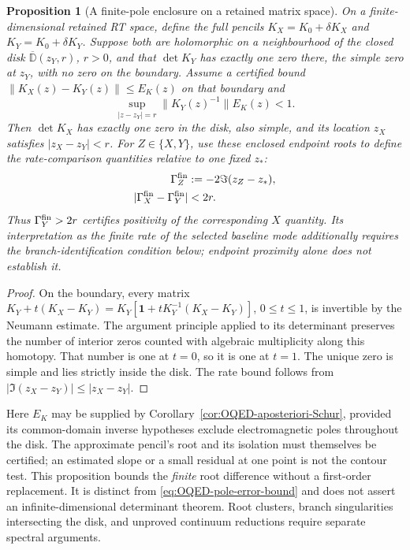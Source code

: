 \documentclass[final,5p,times,twocolumn,numbers,nopreprintline]{elsarticle}
\numberwithin{equation}{section}
\newtheorem{proposition}[theorem]{Proposition}
\theoremstyle{definition}
\theoremstyle{remark}
\newcommand{\one}{\mathbf 1}
\begin{document}
\begin{proposition}[A finite-pole enclosure on a retained matrix space]
\label{prop:OQED-finite-pole-enclosure}
On a finite-dimensional retained RT space, define the full pencils
\(K_X=K_0+\delta K_X\) and \(K_Y=K_0+\delta K_Y\).
Suppose both are holomorphic on a neighbourhood of the closed disk
\(\overline{\mathbb D}(z_Y,r)\), \(r>0\), and that
\(\det K_Y\) has exactly one zero there, the simple zero at \(z_Y\),
with no zero on the boundary. Assume a certified bound
\(\|K_X(z)-K_Y(z)\|\leq E_K(z)\) on that boundary and
\begin{equation}
 \sup_{|z-z_Y|=r}\|K_Y(z)^{-1}\|E_K(z)<1.
 \label{eq:OQED-finite-pole-contour-test}
\end{equation}
Then \(\det K_X\) has exactly one zero in the disk, also simple,
and its location \(z_X\) satisfies \(|z_X-z_Y|<r\).
For \(Z\in\{X,Y\}\), use these enclosed endpoint roots to define
the rate-comparison quantities relative to one fixed \(z_*\):
\begin{equation}
\begin{aligned}
 \Gamma_Z^{\rm fin}&:=-2\Im(z_Z-z_*),\\
 |\Gamma_X^{\rm fin}-\Gamma_Y^{\rm fin}|&<2r.
\end{aligned}
 \label{eq:OQED-finite-pole-rate-enclosure}
\end{equation}
Thus \(\Gamma_Y^{\rm fin}>2r\) certifies positivity of the
corresponding \(X\) quantity. Its interpretation as the finite rate of
the selected baseline mode additionally requires the branch-identification
condition below; endpoint proximity alone does not establish it.
\end{proposition}
\begin{proof}
On the boundary, every matrix
\(K_Y+t(K_X-K_Y)=K_Y[\one+tK_Y^{-1}(K_X-K_Y)]\),
\(0\leq t\leq1\), is invertible by the Neumann estimate.
The argument principle applied to its determinant preserves the number
of interior zeros counted with algebraic multiplicity along this
homotopy. That number is one at \(t=0\), so it is one at \(t=1\).
The unique zero is simple and lies strictly inside the disk. The rate
bound follows from \(|\Im(z_X-z_Y)|\leq|z_X-z_Y|\).
\end{proof}

Here \(E_K\) may be supplied by
Corollary~\ref{cor:OQED-aposteriori-Schur}, provided its common-domain
inverse hypotheses exclude electromagnetic poles throughout the disk.
The approximate pencil's root and its isolation must themselves be
certified; an estimated slope or a small residual at one point is not
the contour test. This proposition bounds the \emph{finite} root
difference without a first-order replacement. It is distinct from
\eqref{eq:OQED-pole-error-bound} and does not assert an
infinite-dimensional determinant theorem. Root clusters, branch singularities
intersecting the disk, and unproved continuum reductions require
separate spectral arguments.
\end{document}
